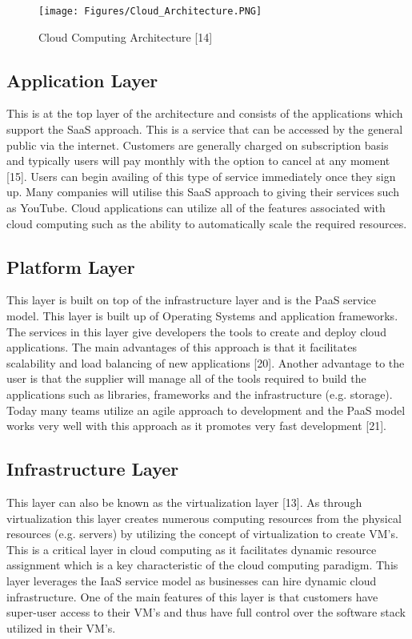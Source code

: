 \documentclass[oneside,12pt]{Classes/RoboticsLaTeX}
\begin{document}
\begin{figure}[h]
\centering
\texttt{[image: Figures/Cloud\_Architecture.PNG]}
\caption{Cloud Computing Architecture [14]}
\end{figure}

\subsection{Application Layer}
This is at the top layer of the architecture and consists of the applications which support the SaaS approach. This is a service that can be accessed by the general public via the internet. Customers are generally charged on subscription basis and typically users will pay monthly with the option to cancel at any moment [15]. Users can begin availing of this type of service immediately once they sign up. Many companies will utilise this SaaS approach to giving their services such as YouTube. Cloud applications can utilize all of the features associated with cloud computing such as the ability to automatically scale the required resources.

\subsection{Platform Layer}
This layer is built on top of the infrastructure layer and is the PaaS service model. This layer is built up of Operating Systems and application frameworks. The services in this layer give developers the tools to create and deploy cloud applications. The main advantages of this approach is that it facilitates scalability and load balancing of new applications [20]. Another advantage to the user is that the supplier will manage all of the tools required to build the applications such as libraries, frameworks and the infrastructure (e.g. storage). Today many teams utilize an agile approach to development and the PaaS model works very well with this approach as it promotes very fast development [21].

\subsection{Infrastructure Layer}
This layer can also be known as the virtualization layer [13]. As through virtualization this layer creates numerous computing resources from the physical resources (e.g. servers) by utilizing the concept of virtualization to create VM's. This is a critical layer in cloud computing as it facilitates dynamic resource assignment which is a key characteristic of the cloud computing paradigm. This layer leverages the IaaS service model as businesses can hire dynamic cloud infrastructure. One of the main features of this layer is that customers have super-user access to their VM's and thus have full control over the software stack utilized in their VM's. 
\end{document}
